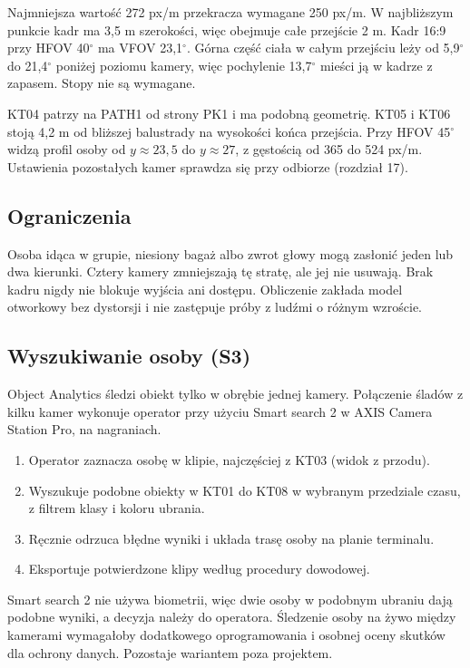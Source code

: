 Najmniejsza wartość 272 px/m przekracza wymagane 250 px/m. W najbliższym punkcie kadr ma 3,5 m szerokości, więc obejmuje całe przejście 2 m. Kadr 16:9 przy HFOV 40$^\circ$ ma VFOV 23,1$^\circ$. Górna część ciała w całym przejściu leży od 5,9$^\circ$ do 21,4$^\circ$ poniżej poziomu kamery, więc pochylenie 13,7$^\circ$ mieści ją w kadrze z zapasem. Stopy nie są wymagane.

KT04 patrzy na PATH1 od strony PK1 i ma podobną geometrię. KT05 i KT06 stoją 4,2 m od bliższej balustrady na wysokości końca przejścia. Przy HFOV 45$^\circ$ widzą profil osoby od $y \approx 23{,}5$ do $y \approx 27$, z gęstością od 365 do 524 px/m. Ustawienia pozostałych kamer sprawdza się przy odbiorze (rozdział 17).

\subsection*{Ograniczenia}
Osoba idąca w grupie, niesiony bagaż albo zwrot głowy mogą zasłonić jeden lub dwa kierunki. Cztery kamery zmniejszają tę stratę, ale jej nie usuwają. Brak kadru nigdy nie blokuje wyjścia ani dostępu. Obliczenie zakłada model otworkowy bez dystorsji i nie zastępuje próby z ludźmi o różnym wzroście.

\subsection*{Wyszukiwanie osoby (S3)}
Object Analytics śledzi obiekt tylko w obrębie jednej kamery. Połączenie śladów z kilku kamer wykonuje operator przy użyciu Smart search 2 w AXIS Camera Station Pro, na nagraniach.\cite{S-AOA,S-SS2}
\begin{enumerate}[noitemsep]
  \item Operator zaznacza osobę w klipie, najczęściej z KT03 (widok z przodu).
  \item Wyszukuje podobne obiekty w KT01 do KT08 w wybranym przedziale czasu, z filtrem klasy i koloru ubrania.
  \item Ręcznie odrzuca błędne wyniki i układa trasę osoby na planie terminalu.
  \item Eksportuje potwierdzone klipy według procedury dowodowej.
\end{enumerate}
Smart search 2 nie używa biometrii, więc dwie osoby w podobnym ubraniu dają podobne wyniki, a decyzja należy do operatora. Śledzenie osoby na żywo między kamerami wymagałoby dodatkowego oprogramowania i osobnej oceny skutków dla ochrony danych. Pozostaje wariantem poza projektem.\cite{S-SS2,L-GDPR}

